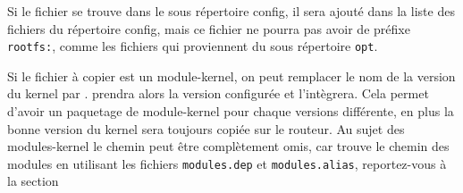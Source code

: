 \begin{enumerate}
        Si le fichier se trouve dans le sous répertoire config, il sera ajouté
        dans la liste des fichiers du répertoire config, mais ce fichier ne
        pourra pas avoir de préfixe \texttt{rootfs:}, comme les fichiers qui
        proviennent du sous répertoire \texttt{opt}.

        Si le fichier à copier est un module-kernel, on peut remplacer le nom
        de la version du kernel par .  prendra alors
        la version configurée et l'intègrera. Cela permet d'avoir un paquetage de
        module-kernel pour chaque versions différente, en plus la bonne version
        du kernel sera toujours copiée sur le routeur. Au sujet des modules-kernel
        le chemin peut être complètement omis, car  trouve le chemin
        des modules en utilisant les fichiers \texttt{modules.dep} et
        \texttt{modules.alias}, reportez-vous à la section


\end{enumerate}
